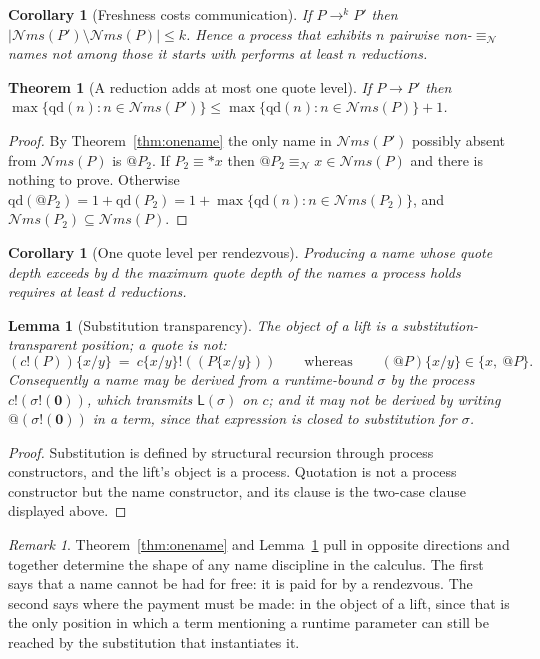 \documentclass[11pt]{article}
\makeatletter
\theoremstyle{definition}
\theoremstyle{plain}
\newtheorem{lemma}[definition]{Lemma}
\newtheorem{theorem}[definition]{Theorem}
\newtheorem{corollary}[definition]{Corollary}
\theoremstyle{remark}
\newtheorem{remark}[definition]{Remark}
\newcommand{\quo}[1]{@#1}
\newcommand{\drp}[1]{{*}#1}
\newcommand{\out}[2]{#1!(#2)}
\newcommand{\nequiv}{\equiv_{\mathcal{N}}}
\newcommand{\nil}{\mathbf{0}}
\newcommand{\Lft}{\mathsf{L}}
\newcommand{\QD}{\mathrm{qd}}
\newcommand{\nms}{\mathcal{N}\!\mathit{ms}}
\makeatother
\begin{document}
\begin{corollary}[Freshness costs communication]\label{cor:cost}
If $P \to^{k} P'$ then $|\nms(P') \setminus \nms(P)| \le k$. Hence a
process that exhibits $n$ pairwise non-$\nequiv$ names not among those it
starts with performs at least $n$ reductions.
\end{corollary}

\begin{theorem}[A reduction adds at most one quote level]\label{thm:onequote}
If $P \to P'$ then
$\max\{\QD(n) : n \in \nms(P')\} \le \max\{\QD(n) : n \in \nms(P)\} + 1$.
\end{theorem}

\begin{proof}
By Theorem~\ref{thm:onename} the only name in $\nms(P')$ possibly absent
from $\nms(P)$ is $\quo{P_2}$. If $P_2 \equiv \drp{x}$ then
$\quo{P_2} \nequiv x \in \nms(P)$ and there is nothing to prove.
Otherwise $\QD(\quo{P_2}) = 1 + \QD(P_2) = 1 + \max\{\QD(n) : n \in \nms(P_2)\}$,
and $\nms(P_2) \subseteq \nms(P)$.
\end{proof}

\begin{corollary}[One quote level per rendezvous]\label{cor:onequote}
Producing a name whose quote depth exceeds by $d$ the maximum quote depth
of the names a process holds requires at least $d$ reductions.
\end{corollary}

\begin{lemma}[Substitution transparency]\label{lem:transparency}
The object of a lift is a substitution-transparent position; a quote is
not:
\[
  (\out{c}{P})\{x/y\} \ =\ \out{c\{x/y\}}{(P\{x/y\})}
  \qquad\text{whereas}\qquad
  (\quo{P})\{x/y\} \in \{x,\ \quo{P}\}.
\]
Consequently a name may be derived from a runtime-bound $\sigma$ by the
process $\out{c}{\out{\sigma}{\nil}}$, which transmits $\Lft(\sigma)$ on
$c$; and it may not be derived by writing $\quo{(\out{\sigma}{\nil})}$ in
a term, since that expression is closed to substitution for $\sigma$.
\end{lemma}

\begin{proof}
Substitution is defined by structural recursion through process
constructors, and the lift's object is a process. Quotation is not a
process constructor but the name constructor, and its clause is the
two-case clause displayed above.
\end{proof}

\begin{remark}
Theorem~\ref{thm:onename} and Lemma~\ref{lem:transparency} pull in
opposite directions and together determine the shape of any name
discipline in the calculus. The first says that a name cannot be had for
free: it is paid for by a rendezvous. The second says where the payment
must be made: in the object of a lift, since that is the only position in
which a term mentioning a runtime parameter can still be reached by the
substitution that instantiates it.
\end{remark}
\end{document}
